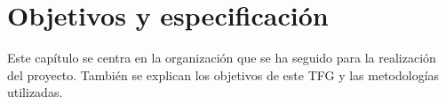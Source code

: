 %
%
%
%
%
%
%
%
%
%

\chapter{Objetivos y especificaci\'on}
\label{cap3}
\label{cap:objetivos}

\begin{FraseCelebre}
\begin{Frase}
\end{Frase}
\begin{Fuente}
\end{Fuente}
\end{FraseCelebre}

\begin{resumen}
  Este cap\'itulo se centra en la organizaci\'on que se ha seguido para la realizaci\'on del proyecto. Tambi\'en se explican los objetivos de este TFG y las metodolog\'ias utilizadas.
\end{resumen}

